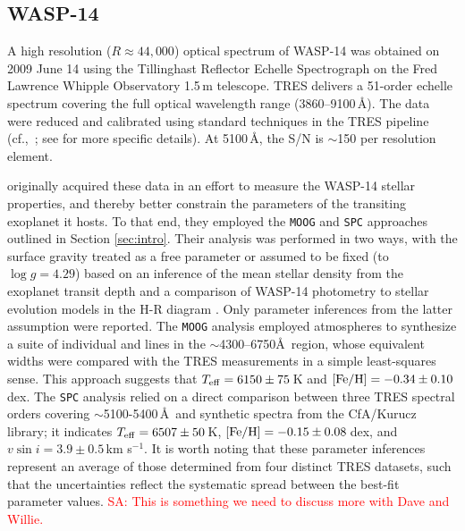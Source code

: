 \documentclass[iop,floatfix]{emulateapj}
\newcommand{\comm}[1]{ \textcolor{red}{SA: #1}}
\begin{document}
\subsection{WASP-14} \label{subsec:wasp}

A high resolution ($R\approx44,000$) optical spectrum of WASP-14 was obtained on 2009 June 14 
using the Tillinghast Reflector Echelle Spectrograph \citep[TRES;][]{furesz08} on the Fred Lawrence 
Whipple Observatory 1.5\,m telescope.  TRES delivers a 51-order echelle spectrum covering the 
full optical wavelength range (3860--9100\,\AA).  The data were reduced and calibrated using 
standard techniques in the TRES pipeline (cf.,~\citealt{buchhave10}; see \citealt{torres12} for 
more specific details).  At 5100\,\AA, the S/N is $\sim$150 per resolution element.  

\citet{torres12} originally acquired these data in an effort to measure the WASP-14 stellar 
properties, and thereby better constrain the parameters of the transiting exoplanet it hosts.  To 
that end, they employed the {\tt MOOG} and {\tt SPC} approaches outlined in Section 
\ref{sec:intro}.  Their analysis was performed in two ways, with the surface gravity treated as a 
free parameter or assumed to be fixed (to $\log g = 4.29$) based on an inference of the mean 
stellar density from the exoplanet transit depth and a comparison of WASP-14 photometry to stellar 
evolution models in the H-R diagram \citep{joshi09}.  Only parameter inferences from the latter 
assumption were reported.  The {\tt MOOG} analysis employed \citet{kurucz93} atmospheres to 
synthesize a suite of individual  and  lines in the $\sim$4300--6750\AA\ 
region, whose equivalent widths were compared with the TRES measurements in a simple least-squares 
sense.  This approach suggests that $T_{\rm eff} = 6150\pm75$\,K and $[{\rm Fe/H}] = 
-0.34\pm0.10$\,dex.  The {\tt SPC} analysis relied on a direct comparison between three TRES 
spectral orders covering $\sim$5100-5400\,\AA\ and synthetic spectra from the {\sc CfA/Kurucz} 
library; it indicates $T_{\rm eff} = 6507\pm50$\,K, $[{\rm Fe/H}] = -0.15\pm0.08$\,dex, and $v \sin 
i = 3.9\pm0.5$\,km s$^{-1}$.  It is worth noting that these parameter inferences represent an 
average of those determined from four distinct TRES datasets, such that the uncertainties reflect 
the systematic spread between the best-fit parameter values. \comm{This is something we need to 
discuss more with Dave and Willie.}
\end{document}
